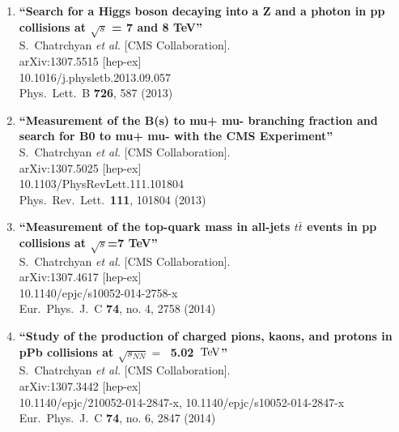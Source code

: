 \documentclass{article}
\begin{document}
\begin{enumerate}
\item%
{\bf ``Search for a Higgs boson decaying into a Z and a photon in pp collisions at $\sqrt{s}$ = 7 and 8 TeV''}
  \\{}S.~Chatrchyan {\it et al.}  [CMS Collaboration].
  \\{}arXiv:1307.5515 [hep-ex]
    \\{}10.1016/j.physletb.2013.09.057
\\{}Phys.\ Lett.\ B {\bf 726}, 587 (2013) %


\item%
{\bf ``Measurement of the B(s) to mu+ mu- branching fraction and search for B0 to mu+ mu- with the CMS Experiment''}
  \\{}S.~Chatrchyan {\it et al.}  [CMS Collaboration].
  \\{}arXiv:1307.5025 [hep-ex]
    \\{}10.1103/PhysRevLett.111.101804
\\{}Phys.\ Rev.\ Lett.\  {\bf 111}, 101804 (2013) %


\item%
{\bf ``Measurement of the top-quark mass in all-jets $t\bar{t}$ events in pp collisions at $\sqrt{s}$=7 TeV''}
  \\{}S.~Chatrchyan {\it et al.}  [CMS Collaboration].
  \\{}arXiv:1307.4617 [hep-ex]
    \\{}10.1140/epjc/s10052-014-2758-x
\\{}Eur.\ Phys.\ J.\ C {\bf 74}, no. 4, 2758 (2014) %


\item%
{\bf ``Study of the production of charged pions, kaons, and protons in pPb collisions at $\sqrt{s_{NN}} =\  $ 5.02 $\,\rm  {TeV}$''}
  \\{}S.~Chatrchyan {\it et al.}  [CMS Collaboration].
  \\{}arXiv:1307.3442 [hep-ex]
    \\{}10.1140/epjc/210052-014-2847-x, 10.1140/epjc/s10052-014-2847-x
\\{}Eur.\ Phys.\ J.\ C {\bf 74}, no. 6, 2847 (2014) %



\end{enumerate}
\end{document}
